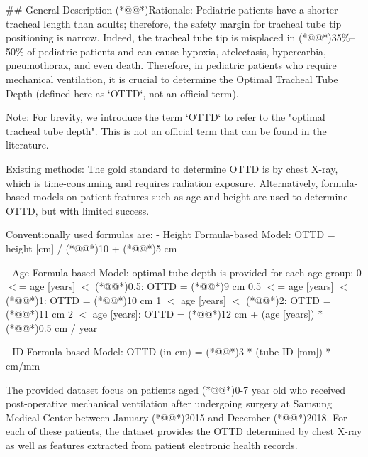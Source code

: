 \documentclass[11pt]{article}
\begin{document}
\begin{codeoutput}
\#\# General Description
(*@@*)Rationale: Pediatric patients have a shorter tracheal length than adults; therefore, the safety margin for tracheal tube tip positioning is narrow.
Indeed, the tracheal tube tip is misplaced in (*@@*)35\%--50\% of pediatric patients and can cause hypoxia, atelectasis, hypercarbia, pneumothorax, and even death.
Therefore, in pediatric patients who require mechanical ventilation, it is crucial to determine the Optimal Tracheal Tube Depth (defined here as `OTTD`, not an official term).

Note: For brevity, we introduce the term `OTTD` to refer to the "optimal tracheal tube depth". This is not an official term that can be found in the literature.

Existing methods: The gold standard to determine OTTD is by chest X-ray, which is time-consuming and requires radiation exposure.
Alternatively, formula-based models on patient features such as age and height are used to determine OTTD, but with limited success.

Conventionally used formulas are:
- Height Formula-based Model: 
OTTD = height [cm] / (*@@*)10 + (*@@*)5 cm 

- Age Formula-based Model:
optimal tube depth is provided for each age group:
0 $<$= age [years] $<$ (*@@*)0.5: OTTD = (*@@*)9 cm 
0.5 $<$= age [years] $<$ (*@@*)1: OTTD = (*@@*)10 cm 
1 $<$ age [years] $<$ (*@@*)2: OTTD = (*@@*)11 cm 
2 $<$ age [years]: OTTD = (*@@*)12 cm + (age [years]) * (*@@*)0.5 cm / year  

- ID Formula-based Model:
OTTD (in cm) = (*@@*)3 * (tube ID [mm]) * cm/mm

The provided dataset focus on patients aged (*@@*)0-7 year old who received post-operative mechanical ventilation after undergoing surgery at Samsung Medical Center between January (*@@*)2015 and December (*@@*)2018.
For each of these patients, the dataset provides the OTTD determined by chest X-ray as well as features extracted from patient electronic health records.


\end{codeoutput}
\end{document}
